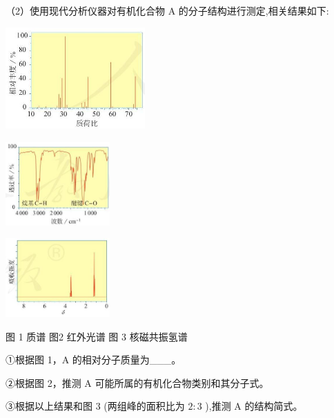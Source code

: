 \documentclass[10pt]{article}
\begin{document}
（2）使用现代分析仪器对有机化合物 \(\mathrm{A}\) 的分子结构进行测定,相关结果如下:

\begin{center}
\includegraphics[max width=0.4\textwidth]{images/0190efc5-b58a-7c43-bfb0-e0a030df9cfd_31_397199.jpg}
\end{center}

\begin{center}
\includegraphics[max width=0.3\textwidth]{images/0190efc5-b58a-7c43-bfb0-e0a030df9cfd_31_571634.jpg}
\end{center}

\begin{center}
\includegraphics[max width=0.3\textwidth]{images/0190efc5-b58a-7c43-bfb0-e0a030df9cfd_31_209317.jpg}
\end{center}

图 1 质谱 图2 红外光谱 图 3 核磁共振氢谱

①根据图 1，A 的相对分子质量为\_\_\_。

②根据图 2，推测 \(\mathrm{A}\) 可能所属的有机化合物类别和其分子式。

③根据以上结果和图 3 (两组峰的面积比为 \(2 : 3\) ),推测 \(\mathrm{A}\) 的结构简式。
\end{document}
